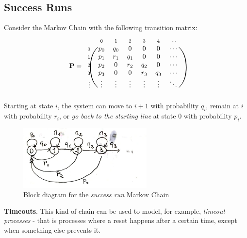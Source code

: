 \documentclass[../template.tex]{subfiles}
\begin{document}
\subsection{Success Runs}
Consider the Markov Chain with the following transition matrix:
\begin{align*}
    \textbf{P} =  \begin{blockarray}{l*{7}{c}}
        \begin{block}{l*{7}{>{\scriptstyle}c<{}}}
            & 0 & 1 & 2 & 3 & 4 & \cdots\\
        \end{block}
        \begin{block}{>{\scriptstyle}r<{}(*{7}{c})}
            0 & p_0 & q_0 & 0 & 0 & 0 & \cdots\\
            1 & p_1 & r_1 & q_1 & 0 & 0 &  \cdots\\
            2 & p_2 & 0 & r_2 & q_2 & 0 & \cdots\\
            3 & p_3 & 0 & 0 & r_3 & q_3 & \cdots \\
            \vdots & \vdots & \vdots & \vdots & \vdots & \vdots & \ddots\\
        \end{block}
    \end{blockarray}
\end{align*}
Starting at state $i$, the system can move to $i+1$ with probability $q_i$, remain at $i$ with probability $r_i$, or \textit{go back to the starting line} at state $0$ with probability $p_i$. 

\begin{figure}[htp]
    \centering
    \includegraphics[width=0.6\textwidth]{image006.png}
    \caption{Block diagram for the \textit{success run} Markov Chain \label{fig:success-run}}
\end{figure}

\begin{appr} \textbf{Timeouts}. 
    This kind of chain can be used to model, for example, \textit{timeout processes} - that is processes where a reset happens after a certain time, except when something else prevents it. 
\end{appr}
\end{document}

